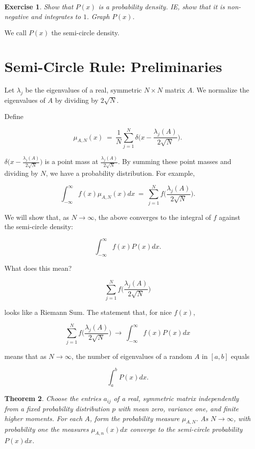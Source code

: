 \documentclass[12pt,letterpaper]{report}
\newcommand\be{\begin{equation}}
\newcommand\ee{\end{equation}}
\newtheorem{thm}{Theorem}[section]
\newtheorem{exe}[thm]{Exercise}
\begin{document}
\begin{exe} Show that $P(x)$ is a probability density. IE, show
that it is non-negative and integrates to $1$. Graph $P(x)$.
\end{exe}

We call $P(x)$ the semi-circle density.



\section{Semi-Circle Rule: Preliminaries}

Let $\lambda_j$ be the eigenvalues of a real, symmetric $N \times
N$ matrix $A$. We normalize the eigenvalues of $A$ by dividing by
$2\sqrt{N}$.

Define

\be \mu_{A,N}(x) \ = \ \frac{1}{N} \sum_{j=1}^N \delta\Big( x -
\frac{\lambda_j(A)}{2\sqrt{N}} \Big). \ee

$\delta\Big( x - \frac{\lambda_j(A)}{2\sqrt{N}} \Big)$ is a point
mass at $\frac{\lambda_j(A)}{2\sqrt{N}}$. By summing these point
masses and dividing by $N$, we have a probability distribution.
For example,

\be \int_{-\infty}^\infty f(x) \mu_{A,N}(x)dx \ = \ \sum_{j=1}^N
f\Big( \frac{\lambda_j(A)}{2\sqrt{N}} \Big). \ee

We will show that, as $N \to \infty$, the above converges to the
integral of $f$ against the semi-circle density:

\be \int_{-\infty}^\infty f(x) P(x)dx. \ee

What does this mean?

\be \sum_{j=1}^N f\Big( \frac{\lambda_j(A)}{2\sqrt{N}} \Big) \ee

looks like a Riemann Sum. The statement that, for nice $f(x)$,

\be \sum_{j=1}^N f\Big( \frac{\lambda_j(A)}{2\sqrt{N}} \Big) \ \to
\ \int_{-\infty}^\infty f(x) P(x)dx \ee

means that as $N \to \infty$, the number of eigenvalues of a
random $A$ in $[a,b]$ equals

\be \int_a^b P(x)dx. \ee


\begin{thm} Choose the entries $a_{ij}$ of a real, symmetric matrix
independently from a fixed probability distribution $p$ with mean
zero, variance one, and finite higher moments. For each $A$, form
the probability measure $\mu_{A,N}$. As $N \to \infty$, with
probability one the measures $\mu_{A,n}(x)dx$ converge to the
semi-circle probability $P(x)dx$.
\end{thm}
\end{document}
